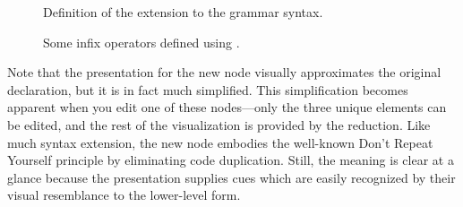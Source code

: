 \begin{figure}[h]
  
  \caption{Definition of the  extension to the grammar syntax.}
  \label{fig-binary}
\end{figure}

\begin{figure}[h]
  
  \caption{Some infix operators defined using .}
  \label{fig-binary-examples}
\end{figure}

Note that the presentation for the new node visually approximates the original declaration, but it is in fact much simplified. This simplification becomes apparent when you edit one of these nodes---only the three unique elements can be edited, and the rest of the visualization is provided by the reduction. Like much syntax extension, the new node embodies the well-known Don't Repeat Yourself principle\cite{dry} by eliminating code duplication. Still, the meaning is clear at a glance because the presentation supplies cues which are easily recognized by their visual resemblance to the lower-level form.




